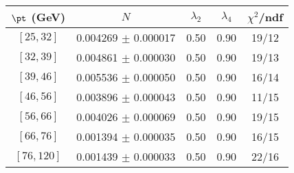 \begin{tabular}{c||c|c|c|c}
$\pt$ (GeV) & $N$ & $\lambda_{2}$ & $\lambda_4$  & $\chi^2$/ndf  \\
\hline
$[25, 32]$ & 0.004269 $\pm$ 0.000017 & 0.50 & 0.90 & 19/12\\
$[32, 39]$ & 0.004861 $\pm$ 0.000030 & 0.50 & 0.90 & 19/13\\
$[39, 46]$ & 0.005536 $\pm$ 0.000050 & 0.50 & 0.90 & 16/14\\
$[46, 56]$ & 0.003896 $\pm$ 0.000043 & 0.50 & 0.90 & 11/15\\
$[56, 66]$ & 0.004026 $\pm$ 0.000069 & 0.50 & 0.90 & 19/15\\
$[66, 76]$ & 0.001394 $\pm$ 0.000035 & 0.50 & 0.90 & 16/15\\
$[76, 120]$ & 0.001439 $\pm$ 0.000033 & 0.50 & 0.90 & 22/16\\
\end{tabular}
